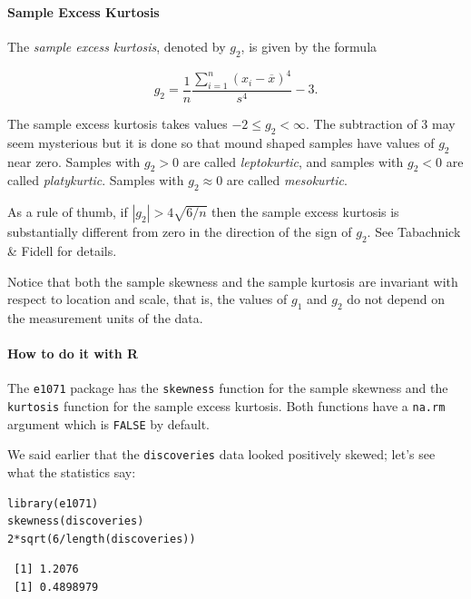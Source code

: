 \documentclass[captions=tableheading]{scrbook}
\begin{document}
\paragraph*{Sample Excess Kurtosis}

The \emph{sample excess kurtosis}, denoted by \(g_{2}\), is given by the formula

\begin{equation}
g_{2}=\frac{1}{n}\frac{\sum_{i=1}^{n}(x_{i}-\overline{x})^{4}}{s^{4}}-3.
\end{equation}

The sample excess kurtosis takes values \(-2\leq g_{2}<\infty\). The subtraction of 3 may seem mysterious but it is done so that mound shaped samples have values of \(g_{2}\) near zero. Samples with \(g_{2}>0\) are called \emph{leptokurtic}, and samples with \(g_{2}<0\) are called \emph{platykurtic}. Samples with \(g_{2}\approx0\) are called \emph{mesokurtic}.

As a rule of thumb, if \(|g_{2}|>4\sqrt{6/n}\) then the sample excess kurtosis is substantially different from zero in the direction of the sign of \(g_{2}\). See Tabachnick \& Fidell \cite{Tabachnick2006} for details.

Notice that both the sample skewness and the sample kurtosis are invariant with respect to location and scale, that is, the values of \(g_{1}\) and \(g_{2}\) do not depend on the measurement units of the data. 

\paragraph*{How to do it with \textsf{R}}

The \texttt{e1071} package \cite{Dimitriadoue1071} has the \texttt{skewness} function for the sample skewness and the \texttt{kurtosis} function for the sample excess kurtosis. Both functions have a \texttt{na.rm} argument which is \texttt{FALSE} by default.

\begin{example}
We said earlier that the \texttt{discoveries} data looked positively skewed; let's see what the statistics say:
\end{example}


\begin{verbatim}
library(e1071)
skewness(discoveries)
2*sqrt(6/length(discoveries))
\end{verbatim}

\begin{verbatim}
 [1] 1.2076
 [1] 0.4898979
\end{verbatim}
\end{document}
